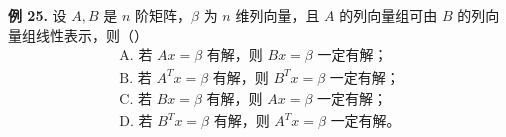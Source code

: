 \begin{problemblock}
\textbf{例 25.} 设 \(A,B\) 是 \(n\) 阶矩阵，\(\beta\) 为 \(n\) 维列向量，且 \(A\) 的列向量组可由 \(B\) 的列向量组线性表示，则（\quad）
\[
\begin{array}{l}
\text{A. 若 }Ax=\beta\text{ 有解，则 }Bx=\beta\text{ 一定有解；}\\
\text{B. 若 }A^Tx=\beta\text{ 有解，则 }B^Tx=\beta\text{ 一定有解；}\\
\text{C. 若 }Bx=\beta\text{ 有解，则 }Ax=\beta\text{ 一定有解；}\\
\text{D. 若 }B^Tx=\beta\text{ 有解，则 }A^Tx=\beta\text{ 一定有解。}
\end{array}
\]
\end{problemblock}
\begin{solutionblock}
\end{solutionblock}

